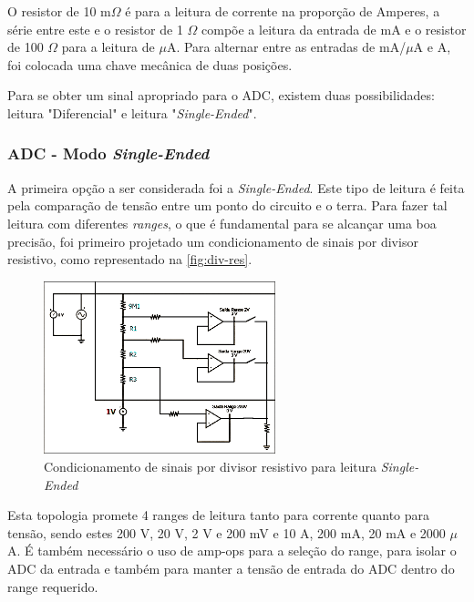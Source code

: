 O resistor de 10 m$\Omega$ é para a leitura de corrente na proporção de Amperes, a série entre este e o resistor de 1 $\Omega$ compõe a leitura da entrada de mA e o resistor de 100 $\Omega$ para a leitura de $\mu$A. Para alternar entre as entradas de mA/$\mu$A e A, foi colocada uma chave mecânica de duas posições.

Para se obter um sinal apropriado para o ADC, existem duas possibilidades: leitura "Diferencial" e leitura "\textit{Single-Ended}".

\subsubsection{ADC - Modo \textit{Single-Ended}}\label{single-ended}

A primeira opção a ser considerada foi a \textit{Single-Ended}. Este tipo de leitura é feita pela comparação de tensão entre um ponto do circuito e o terra. Para fazer tal leitura com diferentes \textit{ranges}, o que é fundamental para se alcançar uma boa precisão, foi primeiro projetado um condicionamento de sinais por divisor resistivo, como representado na \autoref{fig:div-res}.

\begin{figure}[htb!]
    \caption{Condicionamento de sinais por divisor resistivo para leitura \textit{Single-Ended}}
    \vspace*{5mm}
    \label{fig:div-res}
    \includegraphics[width=0.6\textwidth]{figuras/div-res.png}
    \fonte{}
\end{figure}

Esta topologia promete 4 ranges de leitura tanto para corrente quanto para tensão, sendo estes 200 V, 20 V, 2 V e 200 mV e 10 A, 200 mA, 20 mA e 2000 $\mu$A. É também necessário o uso de \gls{amp-op}s para a seleção do range, para isolar o \gls{ADC} da entrada e também para manter a tensão de entrada do \gls{ADC} dentro do range requerido.

